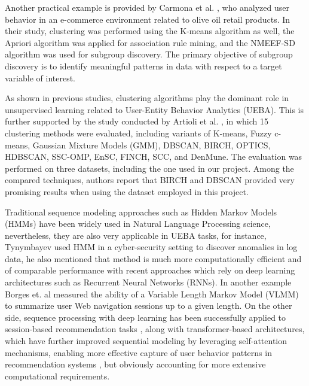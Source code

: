 \documentclass[a4paper,oneside,12pt]{book}
\begin{document}
Another practical example is provided by Carmona et al. \cite{CARMONA201211243}, who analyzed user behavior in an e-commerce environment related to olive oil retail products. In their study, clustering was performed using the K-means algorithm as well, the Apriori algorithm was applied for association rule mining, and the NMEEF-SD algorithm was used for subgroup discovery. The primary objective of subgroup discovery is to identify meaningful patterns in data with respect to a target variable of interest.

As shown in previous studies, clustering algorithms play the dominant role in unsupervised learning related to User-Entity Behavior Analytics (UEBA). This is further supported by the study conducted by Artioli et al. \cite{Artioli2024ACI}, in which 15 clustering methods were evaluated, including variants of K-means, Fuzzy c-means, Gaussian Mixture Models (GMM), DBSCAN, BIRCH, OPTICS, HDBSCAN, SSC-OMP, EnSC, FINCH, SCC, and DenMune. The evaluation was performed on three datasets, including the one used in our project. Among the compared techniques, authors report that BIRCH and DBSCAN provided very promising results when using the dataset employed in this project.

Traditional sequence modeling approaches such as Hidden Markov Models (HMMs) have been widely used in Natural Language Processing science, nevertheless, they are also very applicable in UEBA tasks, for instance, Tynymbayev \cite{TYNYMBAYEV2026200467} used HMM in a cyber-security setting to discover anomalies in log data, he also mentioned that method is much more computationally efficient and of comparable performance with recent approaches which rely on deep learning architectures such as Recurrent Neural Networks (RNNs). In another example Borges et. al \cite{VLMMBorges} measured the ability of a Variable Length Markov Model (VLMM) to summarize user Web navigation sessions up to a given length. On the other side, sequence processing with deep learning has been successfully applied to session-based recommendation tasks \cite{hidasi2016session}, along with transformer-based architectures, which have further improved sequential modeling by leveraging self-attention mechanisms, enabling more effective capture of user behavior patterns in recommendation systems \cite{sun2019bert4rec}, but obviously accounting for more extensive computational requirements.


\end{document}
